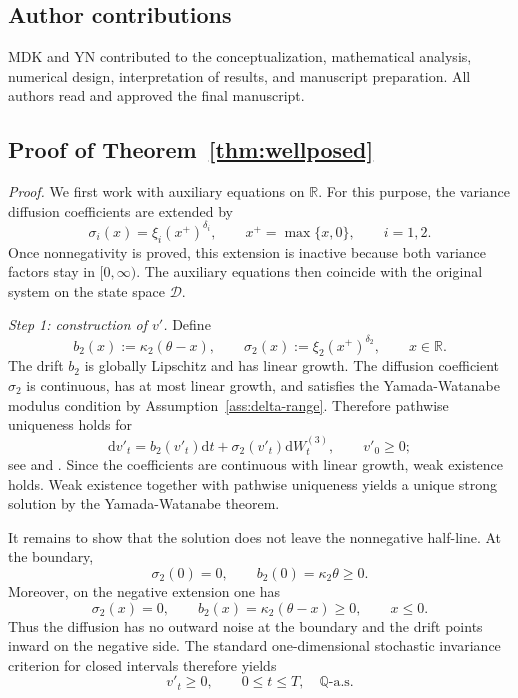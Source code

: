 \documentclass[pdflatex,sn-mathphys-num]{sn-jnl}
\theoremstyle{thmstyleone}%
\theoremstyle{thmstylethree}%
\theoremstyle{thmstyletwo}%
\newcommand{\dd}{\mathrm d}
\newcommand{\Q}{\mathbb Q}
\newcommand{\R}{\mathbb R}
\begin{document}
\subsection*{Author contributions}
MDK and YN contributed to the conceptualization, mathematical analysis, numerical design, interpretation of results, and manuscript preparation. All authors read and approved the final manuscript.
\begin{appendices}

\section{Proof of Theorem~\ref{thm:wellposed}}\label{app:proof-wellposed}

\noindent\textit{Proof.}
We first work with auxiliary equations on $\R$. For this purpose, the variance diffusion coefficients are extended by
$$
\sigma_i(x)=\xi_i(x^+)^{\delta_i},\qquad
x^+=\max\{x,0\},\qquad i=1,2.
$$
Once nonnegativity is proved, this extension is inactive because both variance factors stay in $[0,\infty)$. The auxiliary equations then coincide with the original system on the state space $\mathcal D$.

\emph{Step 1: construction of $v'$.}
Define
$$
b_2(x):=\kappa_2(\theta-x),\qquad
\sigma_2(x):=\xi_2(x^+)^{\delta_2},\qquad x\in\R.
$$
The drift $b_2$ is globally Lipschitz and has linear growth. The diffusion coefficient $\sigma_2$ is continuous, has at most linear growth, and satisfies the Yamada-Watanabe modulus condition by Assumption~\ref{ass:delta-range}. Therefore pathwise uniqueness holds for
$$
\dd v'_t=b_2(v'_t)\dd t+\sigma_2(v'_t)\dd W^{(3)}_t,
\qquad v'_0\ge0;
$$
see \cite{yamada1971uniqueness} and \cite[Ch.~5]{karatzas1991brownian}. Since the coefficients are continuous with linear growth, weak existence holds. Weak existence together with pathwise uniqueness yields a unique strong solution by the Yamada-Watanabe theorem.

It remains to show that the solution does not leave the nonnegative half-line. At the boundary,
$$
\sigma_2(0)=0,\qquad b_2(0)=\kappa_2\theta\ge0.
$$
Moreover, on the negative extension one has
$$
\sigma_2(x)=0,\qquad b_2(x)=\kappa_2(\theta-x)\ge0,\qquad x\le0.
$$
Thus the diffusion has no outward noise at the boundary and the drift points inward on the negative side. The standard one-dimensional stochastic invariance criterion for closed intervals therefore yields
$$
v'_t\ge0,\qquad 0\le t\le T,\quad \Q\text{-a.s.}
$$


\end{appendices}
\end{document}
